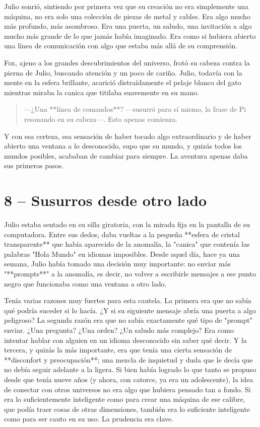 \documentclass[a4paper,12pt]{book}
\begin{document}
Julio sonrió, sintiendo por primera vez que su creación no era simplemente una máquina, no era solo una colección de piezas de metal y cables. Era algo mucho más profundo, más asombroso. Era una puerta, un saludo, una invitación a algo mucho más grande de lo que jamás había imaginado. Era como si hubiera abierto una línea de comunicación con algo que estaba más allá de su comprensión.

Fox, ajeno a los grandes descubrimientos del universo, frotó su cabeza contra la pierna de Julio, buscando atención y un poco de cariño. Julio, todavía con la mente en la esfera brillante, acarició distraídamente el pelaje blanco del gato mientras miraba la canica que titilaba suavemente en su mano.

\begin{quote}
    —¿Una **línea de comandos**? —susurró para sí mismo, la frase de Pi resonando en su cabeza—. Esto apenas comienza.
\end{quote}

Y con esa certeza, esa sensación de haber tocado algo extraordinario y de haber abierto una ventana a lo desconocido, supo que su mundo, y quizás todos los mundos posibles, acababan de cambiar para siempre. La aventura apenas daba sus primeros pasos.

\cleardoublepage %

\chapter*{8 – Susurros desde otro lado}

Julio estaba sentado en su silla giratoria, con la mirada fija en la pantalla de su computadora. Entre sus dedos, daba vueltas a la pequeña **esfera de cristal transparente** que había aparecido de la anomalía, la "canica" que contenía las palabras "Hola Mundo" en idiomas imposibles. Desde aquel día, hace ya una semana, Julio había tomado una decisión muy importante: no enviar más "**prompts**" a la anomalía, es decir, no volver a escribirle mensajes a ese punto negro que funcionaba como una ventana a otro lado.

Tenía varias razones muy fuertes para esta cautela. La primera era que no sabía qué podría suceder si lo hacía. ¿Y si su siguiente mensaje abría una puerta a algo peligroso? La segunda razón era que no sabía exactamente qué tipo de "prompt" enviar. ¿Una pregunta? ¿Una orden? ¿Un saludo más complejo? Era como intentar hablar con alguien en un idioma desconocido sin saber qué decir. Y la tercera, y quizás la más importante, era que tenía una cierta sensación de **disconfort y preocupación**; una mezcla de inquietud y duda que le decía que no debía seguir adelante a la ligera. Si bien había logrado lo que tanto se propuso desde que tenía nueve años (y ahora, con catorce, ya era un adolescente), la idea de conectar con otros universos no era algo que hubiera pensado tan a fondo. Si era lo suficientemente inteligente como para crear una máquina de ese calibre, que podía traer cosas de otras dimensiones, también era lo suficiente inteligente como para ser cauto en su uso. La prudencia era clave.
\end{document}
